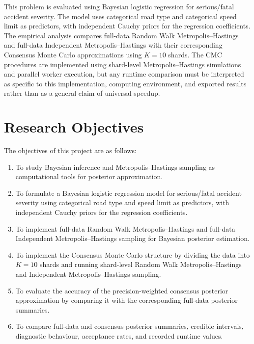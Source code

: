 This problem is evaluated using Bayesian logistic regression for serious/fatal accident severity. The model uses categorical road type and categorical speed limit as predictors, with independent Cauchy priors for the regression coefficients. The empirical analysis compares full-data Random Walk Metropolis--Hastings and full-data Independent Metropolis--Hastings with their corresponding Consensus Monte Carlo approximations using $K=10$ shards. The CMC procedures are implemented using shard-level Metropolis--Hastings simulations and parallel worker execution, but any runtime comparison must be interpreted as specific to this implementation, computing environment, and exported results rather than as a general claim of universal speedup.

\section{Research Objectives}

The objectives of this project are as follows:

\begin{enumerate}
\item To study Bayesian inference and Metropolis--Hastings sampling as computational tools for posterior approximation.

\item To formulate a Bayesian logistic regression model for serious/fatal accident severity using categorical road type and speed limit as predictors, with independent Cauchy priors for the regression coefficients.

\item To implement full-data Random Walk Metropolis--Hastings and full-data Independent Metropolis--Hastings sampling for Bayesian posterior estimation.

\item To implement the Consensus Monte Carlo structure by dividing the data into $K=10$ shards and running shard-level Random Walk Metropolis--Hastings and Independent Metropolis--Hastings sampling.

\item To evaluate the accuracy of the precision-weighted consensus posterior approximation by comparing it with the corresponding full-data posterior summaries.

\item To compare full-data and consensus posterior summaries, credible intervals, diagnostic behaviour, acceptance rates, and recorded runtime values.
\end{enumerate}

